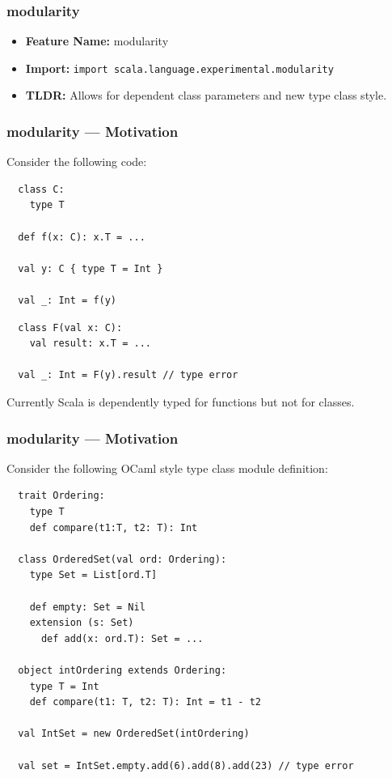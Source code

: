 \documentclass{beamer}
\begin{document}
\begin{frame}[fragile]
  \frametitle{modularity}
  \begin{itemize}
    \item \textbf{Feature Name:} modularity
    \item \textbf{Import:} \texttt{import scala.language.experimental.modularity}
    \item \textbf{TLDR:} Allows for dependent class parameters and new type class style.
  \end{itemize}
\end{frame}

\begin{frame}[fragile]
  \frametitle{modularity --- Motivation}

  Consider the following code:

  \begin{lstlisting}
  class C:
    type T

  def f(x: C): x.T = ...

  val y: C { type T = Int }

  val _: Int = f(y)
  \end{lstlisting}

  \begin{lstlisting}
  class F(val x: C):
    val result: x.T = ...
  
  val _: Int = F(y).result // type error
  \end{lstlisting}

  Currently Scala is dependently typed for functions but not for classes.

\end{frame}

\begin{frame}[fragile]
  \frametitle{modularity --- Motivation}

  Consider the following OCaml style type class module definition:

  \begin{lstlisting}
  trait Ordering:
    type T
    def compare(t1:T, t2: T): Int
  
  class OrderedSet(val ord: Ordering):
    type Set = List[ord.T]
  
    def empty: Set = Nil
    extension (s: Set)
      def add(x: ord.T): Set = ...

  object intOrdering extends Ordering:
    type T = Int
    def compare(t1: T, t2: T): Int = t1 - t2
  
  val IntSet = new OrderedSet(intOrdering)

  val set = IntSet.empty.add(6).add(8).add(23) // type error
  \end{lstlisting}
  
\end{frame}
\end{document}
